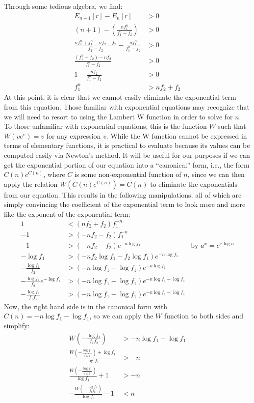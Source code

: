 \documentclass{article}
\begin{document}
Through some tedious algebra, we find:
\begin{align}
    E_{n+1}[r] - E_n[r] &> 0 \\
    (n + 1) - \left( \frac{nf_1^n}{f_1^n - f_2} \right) &> 0 \\
    \frac{nf_1^n + f_1^n-nf_2-f_2}{f_1^n-f_2} - \frac{nf_1^n}{f_1^n - f_2} &> 0 \\
    \frac{(f_1^n-f_2) - nf_2}{f_1^n-f_2} &> 0 \\
    1 - \frac{nf_2}{f_1^n-f_2} &> 0 \\
    f_1^n &>nf_2 + f_2
\end{align}
At this point, it is clear that we cannot easily eliminate the exponential term from this equation.
Those familiar with exponential equations may recognize that we will need to resort to using the Lambert W function in order to solve for $n$.
To those unfamiliar with exponential equations, this is the function $W$ such that $W(ve^v)=v$ for any expression $v$. 
While the W function cannot be expressed in terms of elementary functions, it is practical to evaluate because its values can be computed easily via Newton's method.
It will be useful for our purposes if we can get the exponential portion of our equation into a ``canonical'' form, i.e., the form $C(n)e^{C(n)}$, where $C$ is some non-exponential function of $n$, since we can then apply the relation $W(C(n)e^{C(n)})=C(n)$ to eliminate the exponentials from our equation.
This results in the following manipulations, all of which are simply convincing the coefficient of the exponential term to look more and more like the exponent of the exponential term:
\begin{align}
    1 &< (nf_2+f_2)f_1^{-n} \\
    -1 &> (-nf_2-f_2)f_1^{-n} \\
    -1 &> (-nf_2-f_2)e^{-n\log{f_1}} & \text{by } a^x=e^{x\log{a}}\\
    -\log{f_1} &> (-nf_2\log{f_1}-f_2\log{f_1})e^{-n\log{f_1}}\\
    -\frac{\log{f_1}}{f_2} &> (-n\log{f_1}-\log{f_1})e^{-n\log{f_1}}\\
    -\frac{\log{f_1}}{f_2}e^{-\log{f_1}} &> (-n\log{f_1}-\log{f_1})e^{-n\log{f_1}-\log{f_1}}\\
    -\frac{\log{f_1}}{f_1f_2} &> (-n\log{f_1}-\log{f_1})e^{-n\log{f_1}-\log{f_1}}
\end{align}
Now, the right hand side is in the canonical form with $C(n) = -n\log{f_1}-\log{f_1}$, so we can apply the $W$ function to both sides and simplify:
\begin{align}
    W\left(-\frac{\log{f_1}}{f_1f_2}\right) &> -n\log{f_1}-\log{f_1}\\
    \frac{W\left(-\frac{\log{f_1}}{f_1f_2}\right) + \log{f_1}}{\log{f_1}} &> -n\\
    \frac{W\left(-\frac{\log{f_1}}{f_1f_2}\right)}{\log{f_1}} + 1 &> -n\\
    -\frac{W\left(-\frac{\log{f_1}}{f_1f_2}\right)}{\log{f_1}} - 1 &< n
\end{align}
\end{document}
